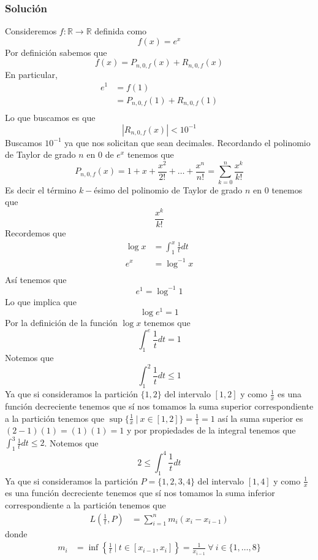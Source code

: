 \documentclass[a4paper]{article}
\begin{document}
\subsubsection*{Solución}
Consideremos \(f : \mathbb{R} \to \mathbb{R}\) definida como
\[
    f(x) = e^{x}
\]
Por definición sabemos que 
\[
    f(x) = P_{n, 0, f}(x) + R_{n, 0, f}(x)
\]
En particular, 
\begin{align*}
    e^{1} &= f(1) \\
    &= P_{n, 0, f}(1) + R_{n, 0, f}(1) \\
\end{align*}
Lo que buscamos es que 
\[
    | R_{n, 0, f}(x) | < 10^{-1}
\]
Buscamos \(10^{-1}\) ya que nos solicitan que sean decimales.
\newline
Recordando el polinomio de Taylor de grado \(n\) en \(0\) de \(e^{x}\) tenemos que
\[
    P_{n, 0, f}(x) = 1 + x + \frac{x^2}{2!} + \dotsc + \frac{x^n}{n!} = \sum_{k = 0}^{n} \frac{x^k}{k!}
\]
Es decir el término \(k-\)ésimo del polinomio de Taylor de grado \(n\) en \(0\) tenemos que
\[
    \frac{x^k}{k!}
\]
Recordemos que 
\begin{align*}
    \log{x} &= \int_{1}^{x} \frac{1}{t} dt \\
    e^{x} &= \log^{-1}{x} \\
\end{align*}
Así tenemos que
\[
    e^{1} = \log^{-1}{1}
\]
Lo que implica que
\[
    \log{e^{1}} = 1
\]
Por la definición de la función \(\log{x}\) tenemos que 
\[
    \int_{1}^{e} \frac{1}{t} dt = 1
\]
Notemos que
\[
    \int_{1}^{2} \frac{1}{t} dt  \leq 1
\]
Ya que si consideramos la partición \(\{1, 2\}\) del intervalo \([1, 2]\) y como \(\frac{1}{x}\)
es una función decreciente tenemos que sí nos tomamos la suma superior correspondiente a la 
partición tenemos que \(\sup \{\frac{1}{x} \ | \ x \in [1, 2]\} = \frac{1}{1} = 1 \) así la suma superior 
es \((2 - 1)(1) = (1)(1) = 1\) y por propiedades de la integral tenemos que \(\int_{1}^{3} \frac{1}{t} dt \leq 2\).
\newline
Notemos que 
\[
    2 \leq \int_{1}^{4} \frac{1}{t} dt  
\]
Ya que si consideramos la partición \(P = \{1, 2, 3, 4\}\) del intervalo \([1, 4]\) y como \(\frac{1}{x}\)
es una función decreciente tenemos que sí nos tomamos la suma inferior correspondiente a la 
partición tenemos que 
\begin{align*}
    L\left(\frac{1}{t}, P\right) &= \sum_{i=1}^{n}m_{i}(x_{i} - x_{i - 1})
\end{align*}
donde 
\begin{align*}
    m_{i} &= \inf \left\{ \frac{1}{t} \ | \ t \in [x_{i - 1}, x_{i} ]  \right\} = \frac{1}{x_{i-1}} \ \forall \ i \in \{1, \dotsc, 8\}
\end{align*}
\end{document}
